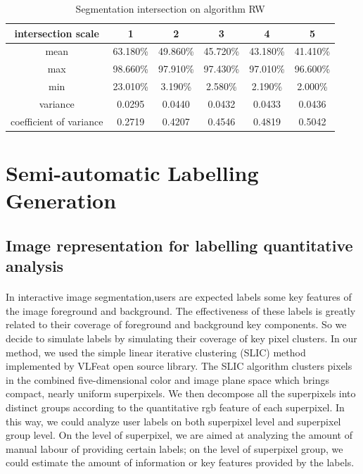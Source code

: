 \documentclass[runningheads,a4paper]{llncs}
\begin{document}
\begin{table}
\centering
\begin{tabular}{|c|c|c|c|c|c|}
\hline
intersection scale & 1 & 2 & 3 & 4& 5 \\
\hline
mean& 63.180\% & 49.860\% & 45.720\% & 43.180\%& 41.410\% \\
\hline
max& 98.660\% & 97.910\% & 97.430\% & 97.010\%& 96.600\% \\
\hline
min& 23.010\% & 3.190\% & 2.580\% & 2.190\%& 2.000\%\\
\hline
variance& 0.0295 & 0.0440 & 0.0432 & 0.0433& 0.0436 \\
\hline
coefficient of variance& 0.2719 & 0.4207 & 0.4546 & 0.4819& 0.5042\\
\hline
\end{tabular}
\caption{Segmentation intersection on algorithm RW}
\label{ta:rw intersection}
\end{table}


\section{Semi-automatic Labelling Generation}

\subsection{Image representation for labelling quantitative analysis}
\paragraph{} In interactive image segmentation,users are expected labels some key features of the image foreground and background. The effectiveness of these labels is greatly related to their coverage of foreground and background key components. So we decide to simulate labels by simulating their coverage of key pixel clusters. In our method, we used the simple linear iterative clustering (SLIC)  method \citep{achanta2010slic} implemented by VLFeat open source library\citep{vedaldi08vlfeat}. The SLIC algorithm clusters pixels in the combined five-dimensional color and image plane space which brings compact, nearly uniform superpixels. We then decompose all the superpixels into distinct groups according to the quantitative rgb feature of each superpixel. In this way, we could analyze user labels on both superpixel level and superpixel group level.  On the level of superpixel, we are aimed at analyzing the amount of manual labour of providing certain labels; on the level of superpixel group, we could estimate the amount of information or key features provided by the labels.
\end{document}

